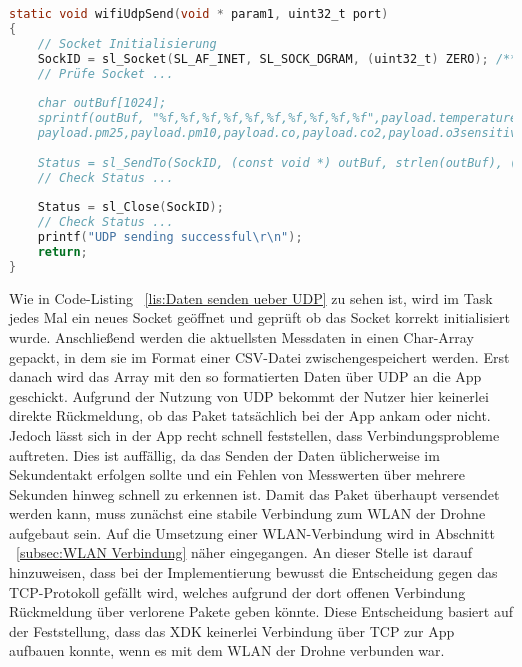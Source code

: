 \begin{lstlisting}[language=C, caption={Daten senden über \acs{UDP}}, label=lis:Daten senden ueber UDP]
static void wifiUdpSend(void * param1, uint32_t port)
{
	// Socket Initialisierung	
	SockID = sl_Socket(SL_AF_INET, SL_SOCK_DGRAM, (uint32_t) ZERO); /**<The return value is a positive number if 
	// Prüfe Socket ...
		
	char outBuf[1024];		
	sprintf(outBuf, "%f,%f,%f,%f,%f,%f,%f,%f,%f,%f",payload.temperature,payload.pressure,payload.humidity,
	payload.pm25,payload.pm10,payload.co,payload.co2,payload.o3sensitive,payload.o3lessSensitive,payload.hazardousGas);
	
	Status = sl_SendTo(SockID, (const void *) outBuf, strlen(outBuf), (uint32_t) ZERO, (SlSockAddr_t *) &Addr, AddrSize);/**<The return value is a number of characters sent;negative if not successful*/
	// Check Status ...
	
	Status = sl_Close(SockID);
	// Check Status ...
	printf("UDP sending successful\r\n");
	return;
}
\end{lstlisting}
Wie in Code-Listing ~\ref{lis:Daten senden ueber UDP} zu sehen ist, wird im Task jedes Mal ein neues Socket geöffnet und geprüft ob das Socket korrekt initialisiert wurde. Anschließend werden die aktuellsten Messdaten in einen Char-Array gepackt, in dem sie im Format einer \acf{CSV}-Datei zwischengespeichert werden. Erst danach wird das Array mit den so formatierten Daten über UDP an die App geschickt. 
\newline
\newline
Aufgrund der Nutzung von UDP bekommt der Nutzer hier keinerlei direkte Rückmeldung, ob das Paket tatsächlich bei der App ankam oder nicht. Jedoch lässt sich in der App recht schnell feststellen, dass Verbindungsprobleme auftreten. Dies ist auffällig, da das Senden der Daten üblicherweise im Sekundentakt erfolgen sollte und ein Fehlen von Messwerten über mehrere Sekunden hinweg schnell zu erkennen ist. \newline
Damit das Paket überhaupt versendet werden kann, muss zunächst eine stabile Verbindung zum \acs{WLAN} der Drohne aufgebaut sein. Auf die Umsetzung einer \acs{WLAN}-Verbindung wird in Abschnitt ~\ref{subsec:WLAN Verbindung} näher eingegangen.\newline
\newline
An dieser Stelle ist darauf hinzuweisen, dass bei der Implementierung bewusst die Entscheidung gegen das \acf{TCP}-Protokoll gefällt wird, welches aufgrund der dort offenen Verbindung Rückmeldung über verlorene Pakete geben könnte. Diese Entscheidung basiert auf der Feststellung, dass das XDK keinerlei Verbindung über \acs{TCP} zur App aufbauen konnte, wenn es mit dem \acs{WLAN} der Drohne verbunden war.

